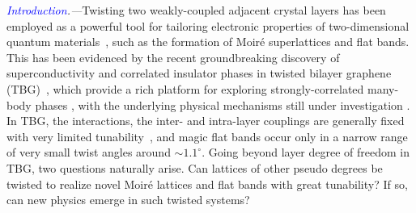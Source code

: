 \documentclass[twocolumn,english,prl,floatfix,citeautoscript,nofootinbib]{revtex4}
\begin{document}
\emph{\textcolor{blue}{Introduction}.---}Twisting two weakly-coupled
adjacent crystal layers has been employed as a powerful tool for tailoring
electronic properties of two-dimensional quantum materials~\cite%
{PhysRevLett.99.256802,nanoLett.10.804,PhysRevB.81.165105,PNAS.108.12233,
PhysRevB.86.155449,PhysRevLett.117.116804,PhysRevLett.119.247402}, such as
the formation of Moir\'{e} superlattices and flat bands. This has been
evidenced by the recent groundbreaking discovery of superconductivity and
correlated insulator phases in twisted bilayer graphene (TBG)~\cite%
{Nature556.43,Nature556.80}, which provide a rich platform for exploring
strongly-correlated many-body phases \cite%
{Nature572.95,science.aaw3780,sciadv.aaw9770,Nat.Phys.15.1174,
Nat.Phys.15.237,PhysRevLett.123.197702}, with the underlying physical
mechanisms still under investigation \cite%
{PhysRevB.98.220504,PhysRevLett.122.257002,PhysRevLett.121.257001,PhysRevLett.121.087001, PhysRevLett.122.026801,PhysRevLett.123.237002,PhysRevB.98.241407,PhysRevB.98.075154,PhysRevLett.121.217001, PhysRevX.8.031089,PhysRevX.8.041041}%
. In TBG, the interactions, the inter- and intra-layer couplings are
generally fixed with very limited tunability~\cite%
{PNAS.114.3364,PhysRevB.98.085144,Nature557.404,science.aav1910}, and magic
flat bands occur only in a narrow range of very small twist angles around $%
\sim 1.1^{\circ }$. Going beyond layer degree of freedom in TBG, two
questions naturally arise. Can lattices of other pseudo degrees be twisted
to realize novel Moir\'{e} lattices and flat bands with great tunability? If
so, can new physics emerge in such twisted systems?
\end{document}
